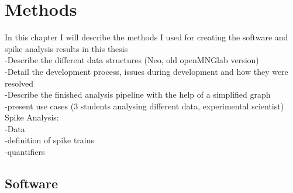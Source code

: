 \chapter{Methods}
In this chapter I will describe the methods I used for creating the software and spike analysis results in this thesis\\
-Describe the different data structures (Neo, old openMNGlab version)\\
-Detail the development process, issues during development and how they were resolved\\
-Describe the finished analysis pipeline with the help of a simplified graph\\
-present use cases (3 students analysing different data, experimental scientist)\\

Spike Analysis:\\
-Data\\
-definition of spike trains\\
-quantifiers\\

\section{Software}

